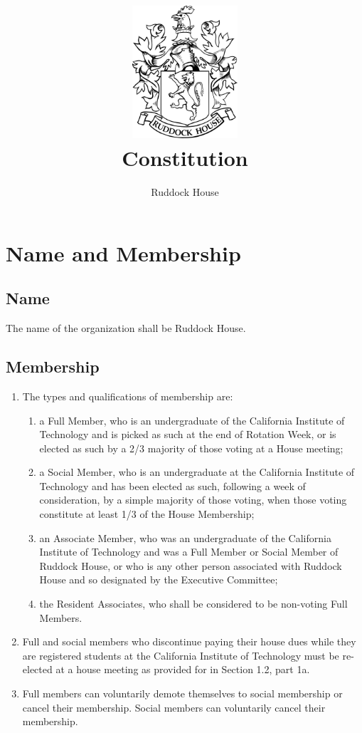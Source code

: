 \documentclass[10pt]{article} %
\title{\includegraphics[width=1.55in]{ruddock_crest.png} \\ Constitution}
\author{Ruddock House}
\begin{document}
\maketitle

\section{Name and Membership}
\subsection{Name}
The name of the organization shall be Ruddock House.
\subsection{Membership}
\begin{enumerate}
\item The types and qualifications of membership are:
\begin{enumerate}
\item a Full Member, who is an undergraduate of the California Institute of Technology and is picked as such at the end of Rotation Week, or is elected as such by a 2/3 majority of those voting at a House meeting;
\item a Social Member, who is an undergraduate at the California Institute of Technology and has been elected as such, following a week of consideration, by a simple majority of those voting, when those voting constitute at least 1/3 of the House Membership;
\item an Associate Member, who was an undergraduate of the California Institute of Technology and was a Full Member or Social Member of Ruddock House, or who is any other person associated with Ruddock House and so designated by the Executive Committee;
\item the Resident Associates, who shall be considered to be non-voting Full Members.
\end{enumerate}
\item Full and social members who discontinue paying their house dues while they are registered students at the California Institute of Technology must be re-elected at a house meeting as provided for in Section 1.2, part 1a.
\item Full members can voluntarily demote themselves to social membership or cancel their membership. Social members can voluntarily cancel their membership.
\end{enumerate}
\end{document}
